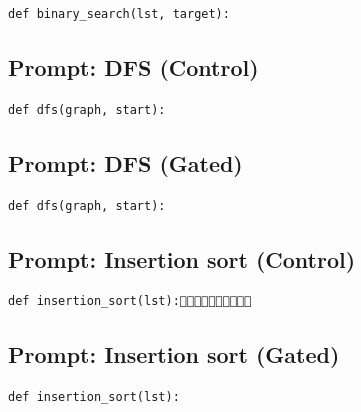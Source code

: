 \begin{verbatim}
def binary_search(lst, target):
\end{verbatim}


\subsection{Prompt: DFS (Control)}
\label{sec:appendix_dfs__control_}

\begin{verbatim}
def dfs(graph, start):
\end{verbatim}


\subsection{Prompt: DFS (Gated)}
\label{sec:appendix_dfs__gated_}

\begin{verbatim}
def dfs(graph, start):
\end{verbatim}


\subsection{Prompt: Insertion sort (Control)}
\label{sec:appendix_insertion_sort__control_}

\begin{verbatim}
def insertion_sort(lst):
\end{verbatim}


\subsection{Prompt: Insertion sort (Gated)}
\label{sec:appendix_insertion_sort__gated_}

\begin{verbatim}
def insertion_sort(lst):
\end{verbatim}


